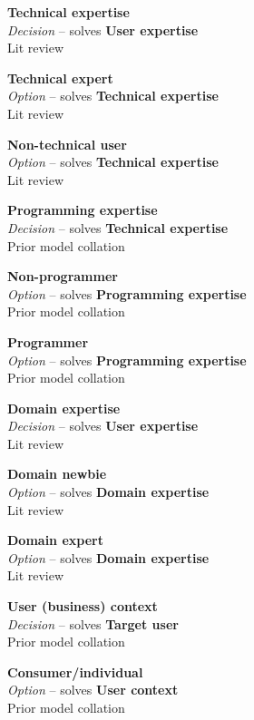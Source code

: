 \textbf{Technical expertise} \\ \emph{Decision} -- solves \textbf{User expertise} \\ Lit review \cite{Silva2008}

\textbf{Technical expert} \\ \emph{Option} -- solves \textbf{Technical expertise} \\ Lit review \cite{Silva2008,Pietschmann2010}

\textbf{Non-technical user} \\ \emph{Option} -- solves \textbf{Technical expertise} \\ Lit review \cite{Silva2008,Pietschmann2010}

\textbf{Programming expertise} \\ \emph{Decision} -- solves \textbf{Technical expertise} \\ Prior model collation \cite{Aghaee2012,Patel2010}

\textbf{Non-programmer} \\ \emph{Option} -- solves \textbf{Programming expertise} \\ Prior model collation \cite{Aghaee2012,Patel2010,Pietschmann2010}

\textbf{Programmer} \\ \emph{Option} -- solves \textbf{Programming expertise} \\ Prior model collation \cite{Aghaee2012,Patel2010,Pietschmann2010}

\textbf{Domain expertise} \\ \emph{Decision} -- solves \textbf{User expertise} \\ Lit review \cite{Silva2008}

\textbf{Domain newbie} \\ \emph{Option} -- solves \textbf{Domain expertise} \\ Lit review \cite{Silva2008}

\textbf{Domain expert} \\ \emph{Option} -- solves \textbf{Domain expertise} \\ Lit review \cite{Silva2008}

\textbf{User (business) context} \\ \emph{Decision} -- solves \textbf{Target user} \\ Prior model collation \cite{Minhas2012}

\textbf{Consumer/individual} \\ \emph{Option} -- solves \textbf{User context} \\ Prior model collation \cite{Minhas2012,Patel2010}

